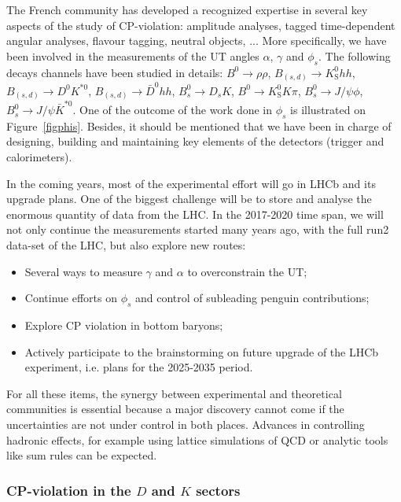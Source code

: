\documentclass[a4paper,12pt]{article}%
\begin{document}
The French community has developed a recognized expertise in several key
aspects of the study of CP-violation: amplitude analyses, tagged
time-dependent angular analyses, flavour tagging, neutral objects, ... More
specifically, we have been involved in the measurements of the UT angles
$\alpha$, $\gamma$ and $\phi_{s}$. The following decays channels have been
studied in details: $B^{0}\rightarrow\rho\rho$, $B_{(s,d)}\rightarrow
K_{\mathrm{S}}^{0}hh$, $B_{(s,d)}\rightarrow D^{0}K^{\ast0}$, $B_{(s,d)}%
\rightarrow\bar{D}^{0}hh$, $B_{s}^{0}\rightarrow D_{s}K$, $B^{0}\rightarrow
K_{\mathrm{S}}^{0}K\pi$, $B_{s}^{0}\rightarrow J/\psi\phi$, $B_{s}%
^{0}\rightarrow J/\psi\bar{K}^{\ast0}$. One of the outcome of the work done in
$\phi_{s}$ is illustrated on Figure~\ref{figphis}. Besides, it should be
mentioned that we have been in charge of designing, building and maintaining
key elements of the detectors (trigger and calorimeters).

In the coming years, most of the experimental effort will go in LHCb and its
upgrade plans. One of the biggest challenge will be to store and analyse the
enormous quantity of data from the LHC. In the 2017-2020 time span, we will
not only continue the measurements started many years ago, with the full run2
data-set of the LHC, but also explore new routes:

\begin{itemize}
\item Several ways to measure $\gamma$ and $\alpha$ to overconstrain the UT;

\item Continue efforts on $\phi_{s}$ and control of subleading penguin contributions;

\item Explore CP violation in bottom baryons;

\item Actively participate to the brainstorming on future upgrade of the LHCb
experiment, i.e. plans for the 2025-2035 period.
\end{itemize}

For all these items, the synergy between experimental and theoretical
communities is essential because a major discovery cannot come if the
uncertainties are not under control in both places. Advances in controlling
hadronic effects, for example using lattice simulations of QCD or analytic
tools like sum rules can be expected.

\subsubsection*{CP-violation in the $D$ and $K$ sectors}
\end{document}
